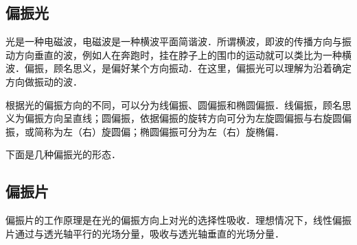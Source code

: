 
\begin{issues}
\issueDraft
\end{issues}


\subsection{偏振光}

光是一种电磁波，电磁波是一种横波平面简谐波．所谓横波，即波的传播方向与振动方向垂直的波，例如人在奔跑时，挂在脖子上的围巾的运动就可以类比为一种横波．偏振，顾名思义，是偏好某个方向振动．在这里，偏振光可以理解为沿着确定方向做振动的波．

根据光的偏振方向的不同，可以分为线偏振、圆偏振和椭圆偏振．线偏振，顾名思义为偏振方向呈直线；圆偏振，依据偏振的旋转方向可分为左旋圆偏振与右旋圆偏振，或简称为左（右）旋圆偏；椭圆偏振可分为左（右）旋椭偏．

下面是几种偏振光的形态．


\subsection{偏振片}
偏振片的工作原理是在光的偏振方向上对光的选择性吸收．理想情况下，线性偏振片通过与透光轴平行的光场分量，吸收与透光轴垂直的光场分量．


